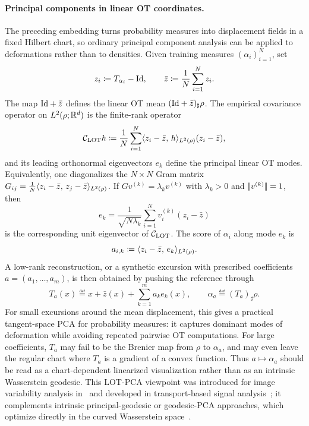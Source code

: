 \paragraph{Principal components in linear OT coordinates.}

The preceding embedding turns probability measures into displacement fields in a fixed Hilbert chart, so ordinary principal component analysis can be applied to deformations rather than to densities. Given training measures \((\alpha_i)_{i=1}^N\), set
\[
	z_i \coloneqq T_{\alpha_i}-\mathrm{Id},
	\qquad
	\bar z \coloneqq \frac1N\sum_{i=1}^N z_i .
\]
The map \(\mathrm{Id}+\bar z\) defines the linear OT mean \((\mathrm{Id}+\bar z)_\sharp\rho\). The empirical covariance operator on \(L^2(\rho;\mathbb{R}^d)\) is the finite-rank operator
\[
	\mathcal C_{\operatorname{LOT}} h
	\coloneqq
	\frac1N\sum_{i=1}^N
	\langle z_i-\bar z,\,h\rangle_{L^2(\rho)}
	(z_i-\bar z),
\]
and its leading orthonormal eigenvectors \(e_k\) define the principal linear OT modes. Equivalently, one diagonalizes the \(N\times N\) Gram matrix \(G_{ij}=\frac1N\langle z_i-\bar z,\,z_j-\bar z\rangle_{L^2(\rho)}\). If \(Gv^{(k)}=\lambda_k v^{(k)}\) with \(\lambda_k>0\) and \(|\!| v^{(k)} |\!|=1\), then
\[
	e_k=\frac{1}{\sqrt{N\lambda_k}}\sum_{i=1}^N v_i^{(k)}(z_i-\bar z)
\]
is the corresponding unit eigenvector of \(\mathcal C_{\operatorname{LOT}}\). The score of \(\alpha_i\) along mode \(e_k\) is
\[
	a_{i,k} \coloneqq \langle z_i-\bar z,\,e_k\rangle_{L^2(\rho)} .
\]
A low-rank reconstruction, or a synthetic excursion with prescribed coefficients \(a=(a_1,\ldots,a_m)\), is then obtained by pushing the reference through
\[
	T_a(x) \eqdef x+\bar z(x)+\sum_{k=1}^m a_k e_k(x),
	\qquad
	\alpha_a \eqdef (T_a)_\sharp\rho .
\]
For small excursions around the mean displacement, this gives a practical tangent-space PCA for probability measures: it captures dominant modes of deformation while avoiding repeated pairwise OT computations. For large coefficients, \(T_a\) may fail to be the Brenier map from \(\rho\) to \(\alpha_a\), and may even leave the regular chart where \(T_a\) is a gradient of a convex function. Thus \(a\mapsto \alpha_a\) should be read as a chart-dependent linearized visualization rather than as an intrinsic Wasserstein geodesic. This LOT-PCA viewpoint was introduced for image variability analysis in~\cite{wang2013linear} and developed in transport-based signal analysis~\cite{thorpe2017transportation,kolouri2017optimal}; it complements intrinsic principal-geodesic or geodesic-PCA approaches, which optimize directly in the curved Wasserstein space~\cite{SeguyCuturi,bigot2017geodesic}.

